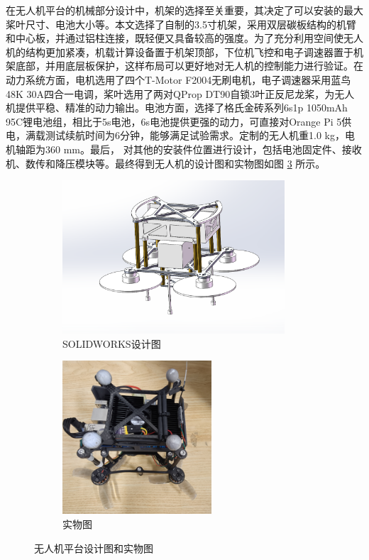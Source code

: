 \documentclass[lang=chs, degree=master, blindreview=true, winfonts=true]{yanputhesis}
\begin{document}
在无人机平台的机械部分设计中，机架的选择至关重要，其决定了可以安装的最大桨叶尺寸、电池大小等。本文选择了自制的3.5寸机架，采用双层碳板结构的机臂和中心板，并通过铝柱连接，既轻便又具备较高的强度。为了充分利用空间使无人机的结构更加紧凑，机载计算设备置于机架顶部，下位机飞控和电子调速器置于机架底部，并用底层板保护，这样布局可以更好地对无人机的控制能力进行验证。在动力系统方面，电机选用了四个T-Motor F2004无刷电机，电子调速器采用蓝鸟48K 30A四合一电调，桨叶选用了两对QProp DT90自锁3叶正反尼龙桨，为无人机提供平稳、精准的动力输出。电池方面，选择了格氏金砖系列6s1p 1050mAh 95C锂电池组，相比于5s电池，6s电池提供更强的动力，可直接对Orange Pi 5供电，满载测试续航时间为6分钟，能够满足试验需求。定制的无人机重1.0 kg，电机轴距为360 mm。最后， 对其他的安装件位置进行设计，包括电池固定件、接收机、数传和降压模块等。最终得到无人机的设计图和实物图如图 \ref{Fig.proximity} 所示。
\begin{figure}[htb!]
	\centering
	\begin{minipage}[t]{0.96\textwidth}
		\centering
		\begin{subfigure}[t]{0.47\textwidth}
			\centering
			\includegraphics[height = 2.25in]{picture/5_7.jpg}
			\caption{SOLIDWORKS设计图\label{fig.path}}
		\end{subfigure}\hfill
		\begin{subfigure}[t]{0.47\textwidth}
			\centering
			\includegraphics[height = 2.25in]{picture/5_8.jpg}
			\caption{实物图\label{fig.proximity}}
		\end{subfigure}
	\end{minipage}
	\caption{无人机平台设计图和实物图\label{Fig.proximity}}
\end{figure}
\end{document}
